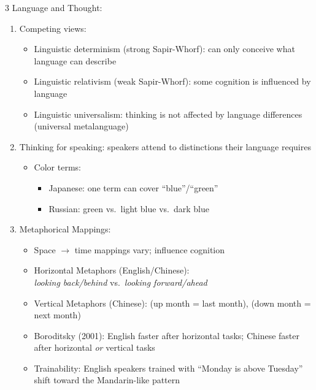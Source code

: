 \documentclass[12pt, a4paper]{article}
\begin{document}
\begin{multicols*}{3}
Language and Thought:
\begin{enumerate}[\roman*.]
  \item Competing views:
    \begin{itemize}[leftmargin=*]\vspace{3pt}
      \item Linguistic determinism (strong Sapir-Whorf): can only conceive what language can describe
      \item Linguistic relativism (weak Sapir-Whorf): some cognition is influenced by language
      \item Linguistic universalism: thinking is not affected by language differences (universal metalanguage)
    \end{itemize}
  \item Thinking for speaking: speakers attend to distinctions their language requires
    \begin{itemize}[leftmargin=*]\vspace{3pt}
      \item Color terms:
        \begin{itemize}[leftmargin=*]\vspace{2pt}
          \item Japanese: one term can cover ``blue''/``green''
          \item Russian: green vs.\ light blue vs.\ dark blue
        \end{itemize}
    \end{itemize}
  \item Metaphorical Mappings:
    \begin{itemize}[leftmargin=*]\vspace{3pt}
      \item Space $\rightarrow$ time mappings vary; influence cognition
      \item Horizontal Metaphors (English/Chinese):\\\textit{looking back/behind} vs.\ \textit{looking forward/ahead}
      \item Vertical Metaphors (Chinese): (up month = last month), (down month = next month)
      \item Boroditsky (2001): English faster after horizontal tasks; Chinese faster after horizontal \textit{or} vertical tasks
      \item Trainability: English speakers trained with ``Monday is above Tuesday'' shift toward the Mandarin-like pattern
    \end{itemize}
\end{enumerate}
\end{multicols*}
\end{document}
